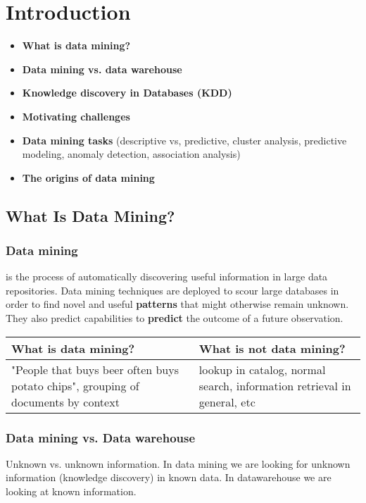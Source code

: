\chapter{Introduction}

	\begin{itemize}
		\item {\bf What is data mining?}
		\item {\bf Data mining vs. data warehouse}
		\item {\bf Knowledge discovery in Databases (KDD)}
		\item {\bf Motivating challenges}
		\item {\bf Data mining tasks} (descriptive vs, predictive, cluster analysis, predictive modeling,
		anomaly detection, association analysis)
		\item {\bf The origins of data mining}
	\end{itemize}
	
\clearpage

\section{What Is Data Mining?}
	
	\subsection*{Data mining} is the process of automatically discovering useful information
	in large data repositories. Data mining techniques are deployed to scour large 
	databases in order to find novel and useful {\bf patterns} that might otherwise remain 
	unknown. They also predict capabilities to {\bf predict} the outcome of a future 
	observation.

	\begin{table}[H]
	\begin{tabular}{| p{6cm} | p{6cm} |}
		\hline
		{\bf What is data mining?} & {\bf What is not data mining?} \\ \hline
		"People that buys beer often buys potato chips", 
		grouping of documents by context & 
		lookup in catalog, normal search, information retrieval in general, etc \\ \hline
	\end{tabular}
	\end{table}	

	\subsection*{Data mining vs. Data warehouse} Unknown vs. unknown information. 
	In data mining we are looking for unknown information (knowledge discovery) in known data. 
	In datawarehouse we are looking at known information. 

